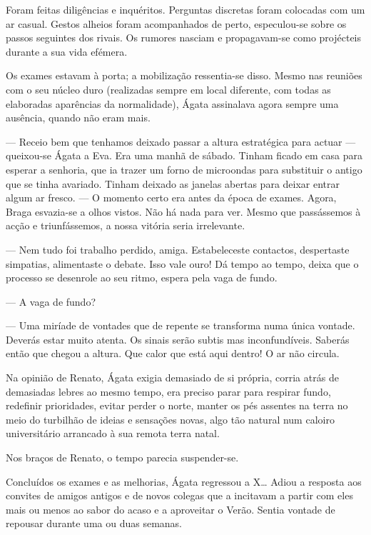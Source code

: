 Foram feitas diligências e inquéritos. Perguntas discretas foram
colocadas com um ar casual. Gestos alheios foram acompanhados de
perto, especulou-se sobre os passos seguintes dos rivais. Os rumores
nasciam e propagavam-se como projécteis durante a sua vida efémera.

Os exames estavam à porta; a mobilização ressentia-se disso. Mesmo nas
reuniões com o seu núcleo duro (realizadas sempre em local diferente,
com todas as elaboradas aparências da normalidade), Ágata assinalava
agora sempre uma ausência, quando não eram mais.

--- Receio bem que tenhamos deixado passar a altura estratégica para
  actuar --- queixou-se Ágata a Eva. Era uma manhã de sábado. Tinham
  ficado em casa para esperar a senhoria, que ia trazer um forno de
  microondas para substituir o antigo que se tinha avariado. Tinham
  deixado as janelas abertas para deixar entrar algum ar fresco. --- O
  momento certo era antes da época de exames. Agora, Braga esvazia-se a
  olhos vistos. Não há nada para ver. Mesmo que passássemos à acção e
  triunfássemos, a nossa vitória seria irrelevante.

--- Nem tudo foi trabalho perdido, amiga. Estabeleceste contactos,
  despertaste simpatias, alimentaste o debate. Isso vale ouro! Dá tempo
  ao tempo, deixa que o processo se desenrole ao seu ritmo, espera
  pela vaga de fundo.

--- A vaga de fundo?

--- Uma miríade de vontades que de repente se transforma numa única
  vontade. Deverás estar muito atenta. Os sinais serão subtis mas
  inconfundíveis. Saberás então que chegou a altura. Que calor que está
  aqui dentro! O ar não circula.

Na opinião de Renato, Ágata exigia demasiado de si própria, corria atrás
de demasiadas lebres ao mesmo tempo, era preciso parar para respirar
fundo, redefinir prioridades, evitar perder o norte, manter os pés
assentes na terra no meio do turbilhão de ideias e sensações novas, algo
tão natural num caloiro universitário arrancado à sua remota terra
natal.

Nos braços de Renato, o tempo parecia suspender-se.

Concluídos os exames e as melhorias, Ágata regressou a X\ldots{} Adiou a
resposta aos convites de amigos antigos e de novos colegas que a
incitavam a partir com eles mais ou menos ao sabor do acaso e a
aproveitar o Verão. Sentia vontade de repousar durante uma ou duas
semanas.

